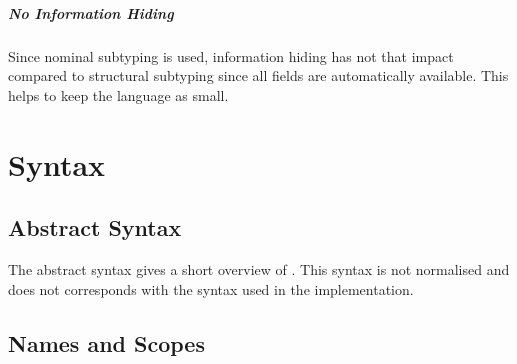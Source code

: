 \paragraph{No Information Hiding}
Since nominal subtyping is used, information hiding has not that impact
compared to structural subtyping since all fields are automatically
available. This helps to keep the language as small.

\chapter{Syntax}

\section{Abstract Syntax}
The abstract syntax gives a short overview of \ooplss. This syntax is
not normalised and does not corresponds with the syntax used in the
implementation.


\section{Names and Scopes}
